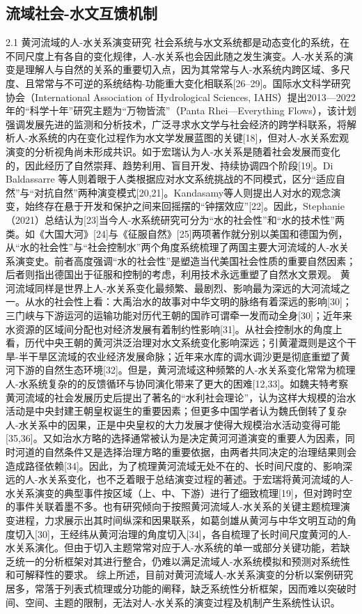 \subsection{流域社会-水文互馈机制}

2.1 黄河流域的人-水关系演变研究
社会系统与水文系统都是动态变化的系统，在不同尺度上有各自的变化规律，人-水关系也会因此随之发生演变。人-水关系的演变是理解人与自然的关系的重要切入点，因为其常常与人-水系统内跨区域、多尺度、且常常与不可逆的系统结构-功能重大变化相联系[26–29]。国际水文科学研究协会（International Association of Hydrological Sciences, IAHS）提出2013—2022年的“科学十年”研究主题为“万物皆流”（Panta Rhei—Everything Flows），该计划强调发展先进的监测和分析技术，广泛寻求水文学与社会经济的跨学科联系，将解析人-水系统的内在变化过程作为水文学发展蓝图的关键[18]，但对人-水关系宏观演变的分析视角尚未形成共识。如于宏瑞认为人-水关系是随着社会发展而变化的，因此经历了自然崇拜、趋势利用、盲目开发、持续协调四个阶段[19]。Di Baldassarre 等人则着眼于人类根据应对水文系统挑战的不同模式，区分“适应自然”与“对抗自然”两种演变模式[20,21]。Kandasamy等人则提出人对水的观念演变，始终存在悬于开发和保护之间来回摇摆的“钟摆效应”[22]。因此，Stephanie（2021）总结认为[23]当今人-水系统研究可分为“水的社会性”和“水的技术性”两类。如《大国大河》[24]与《征服自然》[25]两项著作就分别以美国和德国为例，从“水的社会性”与“社会控制水”两个角度系统梳理了两国主要大河流域的人-水关系演变史。前者高度强调“水的社会性”是塑造当代美国社会性质的重要自然因素；后者则指出德国出于征服和控制的考虑，利用技术永远重塑了自然水文景观。
黄河流域同样是世界上人-水关系变化最频繁、最剧烈、影响最为深远的大河流域之一。从水的社会性上看：大禹治水的故事对中华文明的脉络有着深远的影响[30]；三门峡与下游运河的运输功能对历代王朝的国祚可谓牵一发而动全身[30]；近年来水资源的区域间分配也对经济发展有着制约性影响[31]。从社会控制水的角度上看，历代中央王朝的黄河洪泛治理对水文系统变化影响深远；引黄灌溉则是这个干旱-半干旱区流域的农业经济发展命脉；近年来水库的调水调沙更是彻底重塑了黄河下游的自然生态环境[32]。但是，黄河流域这种频繁的人-水关系变化常常为梳理人-水系统复杂的的反馈循环与协同演化带来了更大的困难[12,33]。如魏夫特考察黄河流域的社会发展历史后提出了著名的“水利社会理论”，认为这样大规模的治水活动是中央封建王朝皇权诞生的重要因素；但更多中国学者认为魏氏倒转了复杂人-水关系中的因果，正是中央皇权的大力发展才使得大规模治水活动变得可能[35,36]。又如治水方略的选择通常被认为是决定黄河河道演变的重要人为因素，同时河道的自然条件又是选择治理方略的重要依据，由两者共同决定的治理结果则会造成路径依赖[34]。因此，为了梳理黄河流域无处不在的、长时间尺度的、影响深远的人-水关系变化，也不乏着眼于总结演变过程的著述。于宏瑞将黄河流域的人-水关系演变的典型事件按区域（上、中、下游）进行了细致梳理[19]，但对跨时空的事件关联着墨不多。也有研究倾向于按照黄河流域人-水关系的关键主题梳理演变进程，力求展示出其时间纵深和因果联系，如葛剑雄从黄河与中华文明互动的角度切入[30]，王经纬从黄河治理的角度切入[34]，各自梳理了长时间尺度黄河的人-水关系演化。但由于切入主题常常对应于人-水系统的单一或部分关键功能，若缺乏统一的分析框架对其进行整合，仍难以满足流域人-水系统模拟和预测对系统性和可解释性的要求。
综上所述，目前对黄河流域人-水关系演变的分析以案例研究居多，常落于列表式梳理或分功能的阐释，缺乏系统性分析框架，因而难以突破时间、空间、主题的限制，无法对人-水关系的演变过程及机制产生系统性认识。


